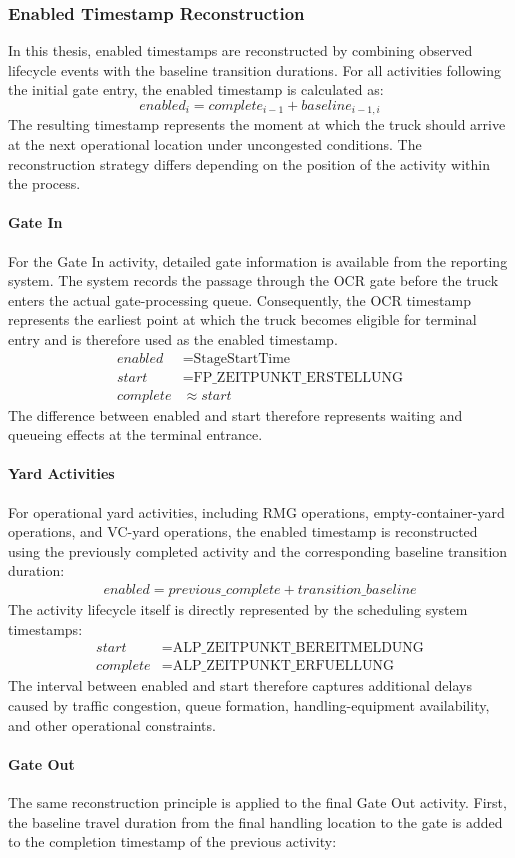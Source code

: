         \subsubsection{Enabled Timestamp Reconstruction} 
        In this thesis, enabled timestamps are reconstructed by combining observed lifecycle events with the baseline transition durations. For all activities following the initial gate entry, the enabled timestamp is calculated as: \begin{equation} enabled_i = complete_{i-1} + baseline_{i-1,i} \end{equation} The resulting timestamp represents the moment at which the truck should arrive at the next operational location under uncongested conditions. The reconstruction strategy differs depending on the position of the activity within the process. \paragraph{Gate In} For the Gate In activity, detailed gate information is available from the reporting system. The system records the passage through the OCR gate before the truck enters the actual gate-processing queue. Consequently, the OCR timestamp represents the earliest point at which the truck becomes eligible for terminal entry and is therefore used as the enabled timestamp. \begin{align} enabled &= \text{StageStartTime} \\ start &= \text{FP\_ZEITPUNKT\_ERSTELLUNG} \\ complete &\approx start \end{align} The difference between enabled and start therefore represents waiting and queueing effects at the terminal entrance. \paragraph{Yard Activities} For operational yard activities, including RMG operations, empty-container-yard operations, and VC-yard operations, the enabled timestamp is reconstructed using the previously completed activity and the corresponding baseline transition duration: \begin{align} enabled = previous\_complete + transition\_baseline \end{align} The activity lifecycle itself is directly represented by the scheduling system timestamps: \begin{align} start &= \text{ALP\_ZEITPUNKT\_BEREITMELDUNG} \\ complete &= \text{ALP\_ZEITPUNKT\_ERFUELLUNG} \end{align} The interval between enabled and start therefore captures additional delays caused by traffic congestion, queue formation, handling-equipment availability, and other operational constraints. \paragraph{Gate Out} The same reconstruction principle is applied to the final Gate Out activity. First, the baseline travel duration from the final handling location to the gate is added to the completion timestamp of the previous activity: 